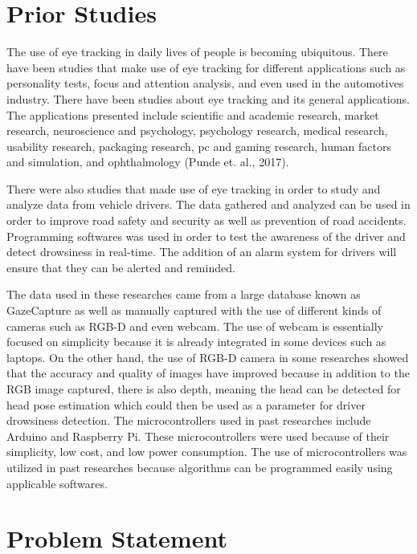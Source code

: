 \section{Prior Studies}

The use of eye tracking in daily lives of people is becoming ubiquitous. There have been studies that make use of eye tracking for different applications such as personality tests, focus and attention analysis, and even used in the automotives industry. There have been studies about eye tracking and its general applications. The applications presented include scientific and academic research, market research, neuroscience and psychology, psychology research, medical research, usability research, packaging research, pc and gaming research, human factors and simulation, and ophthalmology (Punde et. al., 2017). 

There were also studies that made use of eye tracking in order to study and analyze data from vehicle drivers. The data gathered and analyzed can be used in order to improve road safety and security as well as prevention of road accidents. Programming softwares was used in order to test the awareness of the driver and detect drowsiness in real-time. The addition of an alarm system for drivers will ensure that they can be alerted and reminded. 

The data used in these researches came from a large database known as GazeCapture as well as manually captured with the use of different kinds of cameras such as RGB-D and even webcam. The use of webcam is essentially focused on simplicity because it is already integrated in some devices such as laptops. On the other hand, the use of RGB-D camera in some researches showed that the accuracy and quality of images have improved because in addition to the RGB image captured, there is also depth, meaning the head can be detected for head pose estimation which could then be used as a parameter for driver drowsiness detection. The microcontrollers used in past researches include Arduino and Raspberry Pi. These microcontrollers were used because of their simplicity, low cost, and low power consumption. The use of microcontrollers was utilized in past researches because algorithms can be programmed easily using applicable softwares.


\section{Problem Statement}


